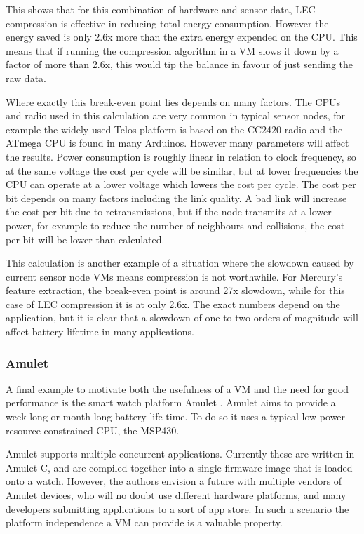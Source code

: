 This shows that for this combination of hardware and sensor data, LEC compression is effective in reducing total energy consumption. However the energy saved is only 2.6x more than the extra energy expended on the CPU. This means that if running the compression algorithm in a VM slows it down by a factor of more than 2.6x, this would tip the balance in favour of just sending the raw data.

Where exactly this break-even point lies depends on many factors. The CPUs and radio used in this calculation are very common in typical sensor nodes, for example the widely used Telos platform \cite{Polastre:2005ut} is based on the CC2420 radio and the ATmega CPU is found in many Arduinos. However many parameters will affect the results. Power consumption is roughly linear in relation to clock frequency, so at the same voltage the cost per cycle will be similar, but at lower frequencies the CPU can operate at a lower voltage which lowers the cost per cycle. The cost per bit depends on many factors including the link quality. A bad link will increase the cost per bit due to retransmissions, but if the node transmits at a lower power, for example to reduce the number of neighbours and collisions, the cost per bit will be lower than calculated.

This calculation is another example of a situation where the slowdown caused by current sensor node VMs means compression is not worthwhile. For Mercury's feature extraction, the break-even point is around 27x slowdown, while for this case of LEC compression it is at only 2.6x. The exact numbers depend on the application, but it is clear that a slowdown of one to two orders of magnitude will affect battery lifetime in many applications.

\subsubsection{Amulet}
A final example to motivate both the usefulness of a VM and the need for good performance is the smart watch platform Amulet \cite{Hester:2016je}. Amulet aims to provide a week-long or month-long battery life time. To do so it uses a typical low-power resource-constrained CPU, the MSP430.

Amulet supports multiple concurrent applications. Currently these are written in Amulet C, and are compiled together into a single firmware image that is loaded onto a watch. However, the authors envision a future with multiple vendors of Amulet devices, who will no doubt use different hardware platforms, and many developers submitting applications to a sort of app store. In such a scenario the platform independence a VM can provide is a valuable property.


